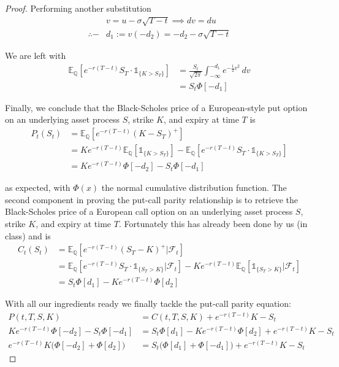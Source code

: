 \documentclass[12pt]{article}
\newlength\tindent
\renewcommand{\indent}{\hspace*{\tindent}}
\begin{document}
\begin{proof}
Performing another substitution
\begin{align*}
	&v = u - \sigma\sqrt{T - t} \implies dv = du \\
	\therefore -&d_1 := v(-d_2) = -d_2 - \sigma\sqrt{T - t}
\end{align*}

We are left with
\begin{align*}
	\mathbb E_{\mathbb Q}[ e^{-r(T - t)} S_T \cdot \mathds 1_{\{K > S_T\}}] &= \frac{S_t}{\sqrt{2\pi}} \int^{-d_1}_{-\infty} e^{-\frac{1}{2}v^2}\,dv \\
	&= S_t\Phi[-d_1]
\end{align*}

\indent Finally, we conclude that the Black-Scholes price of a European-style put option on an underlying asset process $S$, strike $K$, and expiry at time $T$ is
\begin{align*}
	P_t(S_t) &= \mathbb E_{\mathbb Q}[e^{-r(T - t)}(K - S_T)^+] \\
	&= Ke^{-r(T - t)}\mathbb E_{\mathbb Q}[\mathds 1_{\{K > S_T\}}] -\mathbb E_{\mathbb Q}[ e^{-r(T - t)}S_T \cdot \mathds 1_{\{K > S_T\}}] \\
	&= Ke^{-r(T - t)}\Phi[-d_2] - S_t\Phi[-d_1]
\end{align*}

as expected, with $\Phi(x)$ the normal cumulative distribution function. The second component in proving the put-call parity relationship is to retrieve the Black-Scholes price of a European call option on an underlying asset process $S$, strike $K$, and expiry at time $T$. Fortunately this has already been done by us (in class) and is
\begin{align*}
	C_t(S_t) &= \mathbb E_{\mathbb Q}[e^{-r(T - t)}(S_T - K)^+ |\mathcal F_t] \\
	&= \mathbb E_{\mathbb Q}[ e^{-r(T - t)}S_T \cdot \mathds 1_{\{S_T > K\}} |\mathcal F_t] - Ke^{-r(T - t)}\mathbb E_{\mathbb Q}[\mathds 1_{\{S_T > K\}} |\mathcal F_t] \\
	&= S_t\Phi[d_1] - Ke^{-r(T - t)}\Phi[d_2]
\end{align*}

With all our ingredients ready we finally tackle the put-call parity equation:
\begin{align*}
	P(t,T,S,K) &= C(t,T,S,K) + e^{-r(T - t)}K - S_t \\
	Ke^{-r(T - t)}\Phi[-d_2] - S_t\Phi[-d_1] &= S_t\Phi[d_1] - Ke^{-r(T - t)}\Phi[d_2] + e^{-r(T - t)}K - S_t\\
	e^{-r(T - t)}K\big(\Phi[-d_2] + \Phi[d_2]\big) &= S_t\big(\Phi[d_1] + \Phi[-d_1]\big) + e^{-r(T - t)}K - S_t
\end{align*}


\end{proof}
\end{document}
